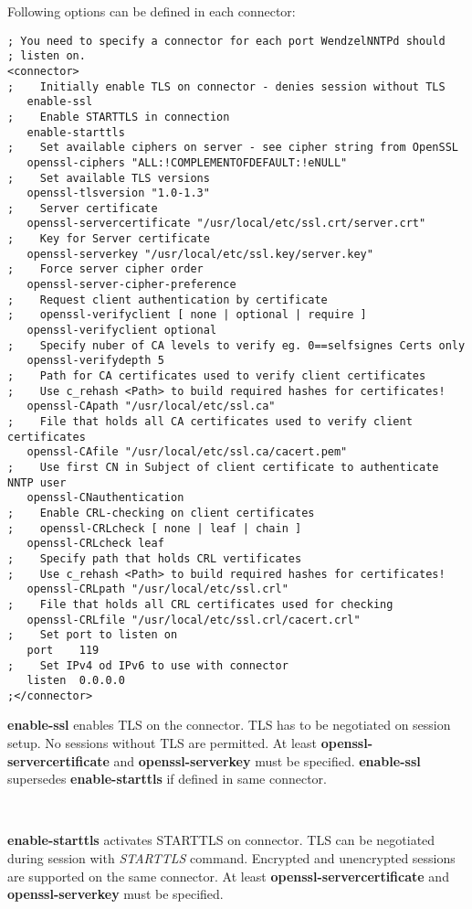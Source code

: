 Following options can be defined in each connector:
\begin{verbatim}
; You need to specify a connector for each port WendzelNNTPd should
; listen on.
<connector>
;    Initially enable TLS on connector - denies session without TLS
   enable-ssl
;    Enable STARTTLS in connection
   enable-starttls
;    Set available ciphers on server - see cipher string from OpenSSL
   openssl-ciphers "ALL:!COMPLEMENTOFDEFAULT:!eNULL"
;    Set available TLS versions
   openssl-tlsversion "1.0-1.3"
;    Server certificate
   openssl-servercertificate "/usr/local/etc/ssl.crt/server.crt"
;    Key for Server certificate
   openssl-serverkey "/usr/local/etc/ssl.key/server.key"
;    Force server cipher order
   openssl-server-cipher-preference
;    Request client authentication by certificate
;    openssl-verifyclient [ none | optional | require ]
   openssl-verifyclient optional
;    Specify nuber of CA levels to verify eg. 0==selfsignes Certs only
   openssl-verifydepth 5
;    Path for CA certificates used to verify client certificates
;    Use c_rehash <Path> to build required hashes for certificates!
   openssl-CApath "/usr/local/etc/ssl.ca"
;    File that holds all CA certificates used to verify client certificates
   openssl-CAfile "/usr/local/etc/ssl.ca/cacert.pem"
;    Use first CN in Subject of client certificate to authenticate NNTP user
   openssl-CNauthentication
;    Enable CRL-checking on client certificates
;    openssl-CRLcheck [ none | leaf | chain ]
   openssl-CRLcheck leaf
;    Specify path that holds CRL vertificates
;    Use c_rehash <Path> to build required hashes for certificates!
   openssl-CRLpath "/usr/local/etc/ssl.crl"
;    File that holds all CRL certificates used for checking
   openssl-CRLfile "/usr/local/etc/ssl.crl/cacert.crl"
;    Set port to listen on
   port    119
;    Set IPv4 od IPv6 to use with connector
   listen  0.0.0.0
;</connector>
\end{verbatim}

\textbf{enable-ssl} enables TLS on the connector.
TLS has to be negotiated on session setup.
No sessions without TLS are permitted.
At least \textbf{openssl-servercertificate} and \textbf{openssl-serverkey} must be specified.
\textbf{enable-ssl} supersedes \textbf{enable-starttls} if defined in same connector.

~

\textbf{enable-starttls} activates STARTTLS on connector.
TLS can be negotiated during session with \textit{STARTTLS} command. 
Encrypted and unencrypted sessions are supported on the same connector.
At least \textbf{openssl-servercertificate} and \textbf{openssl-serverkey} must be specified.

